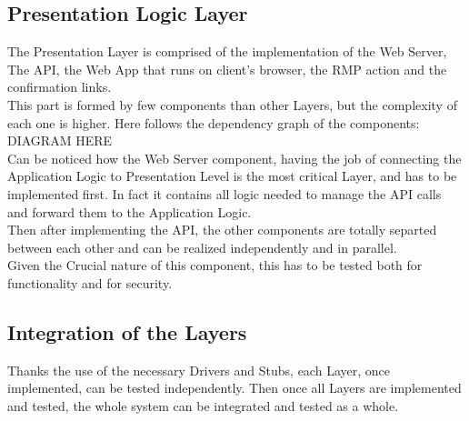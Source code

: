 \subsection{Presentation Logic Layer}
The Presentation Layer is comprised of the implementation of the Web Server, The API, the Web App that runs on client's browser, the RMP action and the confirmation links.\\
This part is formed by few components than other Layers, but the complexity of each one is higher. Here follows the dependency graph of the components:
DIAGRAM HERE\\
Can be noticed how the Web Server component, having the job of connecting the Application Logic to Presentation Level is the most critical Layer, and has to be implemented first. In fact it contains all logic needed to manage the API calls and forward them to the Application Logic.\\
Then after implementing the API, the other components are totally separted between each other and can be realized independently and in parallel.\\   
Given the Crucial nature of this component, this has to be tested both for functionality and for security. \\

\subsection{Integration of the Layers}
Thanks the use of the necessary Drivers and Stubs, each Layer, once implemented, can be tested independently. Then once all Layers are implemented and tested, the whole system can be integrated and tested as a whole.\\